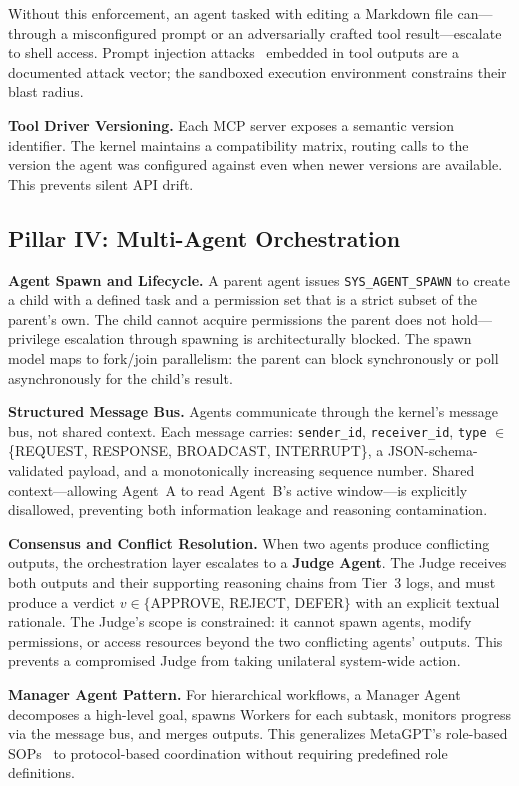 \documentclass[journal]{IEEEtran}
\begin{document}
Without this enforcement, an agent tasked with editing a Markdown file can---through a misconfigured prompt or an adversarially crafted tool result---escalate to shell access. Prompt injection attacks~\cite{liu2023promptinjection} embedded in tool outputs are a documented attack vector; the sandboxed execution environment constrains their blast radius.

\textbf{Tool Driver Versioning.} Each MCP server exposes a semantic version identifier. The kernel maintains a compatibility matrix, routing calls to the version the agent was configured against even when newer versions are available. This prevents silent API drift.

\subsection{Pillar IV: Multi-Agent Orchestration}
\label{sec:orchestration}

\textbf{Agent Spawn and Lifecycle.} A parent agent issues \texttt{SYS\_AGENT\_SPAWN} to create a child with a defined task and a permission set that is a strict subset of the parent's own. The child cannot acquire permissions the parent does not hold---privilege escalation through spawning is architecturally blocked. The spawn model maps to fork/join parallelism: the parent can block synchronously or poll asynchronously for the child's result.

\textbf{Structured Message Bus.} Agents communicate through the kernel's message bus, not shared context. Each message carries: \texttt{sender\_id}, \texttt{receiver\_id}, \texttt{type} $\in$ \{REQUEST, RESPONSE, BROADCAST, INTERRUPT\}, a JSON-schema-validated payload, and a monotonically increasing sequence number. Shared context---allowing Agent~A to read Agent~B's active window---is explicitly disallowed, preventing both information leakage and reasoning contamination.

\textbf{Consensus and Conflict Resolution.} When two agents produce conflicting outputs, the orchestration layer escalates to a \textbf{Judge Agent}. The Judge receives both outputs and their supporting reasoning chains from Tier~3 logs, and must produce a verdict $v \in \{$APPROVE, REJECT, DEFER$\}$ with an explicit textual rationale. The Judge's scope is constrained: it cannot spawn agents, modify permissions, or access resources beyond the two conflicting agents' outputs. This prevents a compromised Judge from taking unilateral system-wide action.

\textbf{Manager Agent Pattern.} For hierarchical workflows, a Manager Agent decomposes a high-level goal, spawns Workers for each subtask, monitors progress via the message bus, and merges outputs. This generalizes MetaGPT's role-based SOPs~\cite{hong2023metagpt} to protocol-based coordination without requiring predefined role definitions.
\end{document}
